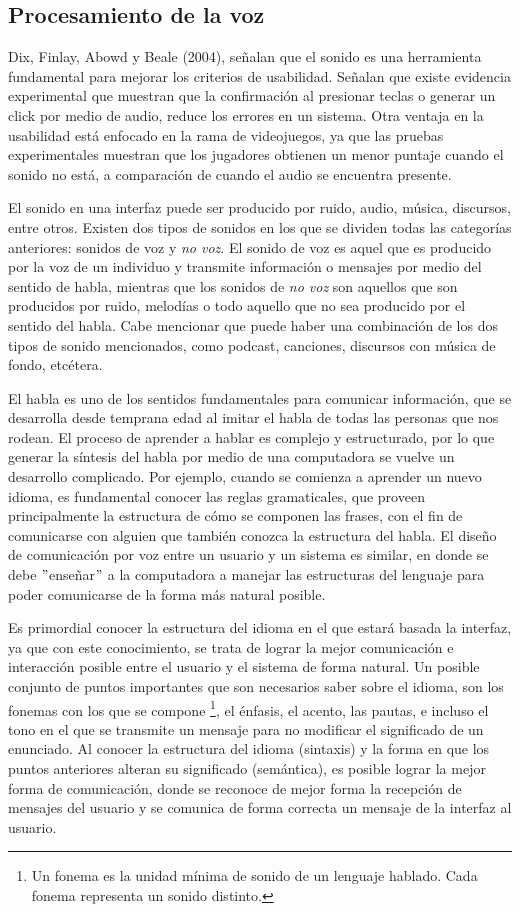 \subsection{Procesamiento de la voz}
\label{ProcesamientoVozCap3}

Dix, Finlay, Abowd y Beale (2004), señalan que el sonido es una herramienta fundamental para mejorar los criterios de usabilidad. Señalan que existe evidencia experimental que muestran que la confirmación al presionar teclas o generar un click por medio de audio, reduce los errores en un sistema. Otra ventaja en la usabilidad está enfocado en la rama de videojuegos, ya que las pruebas experimentales muestran que los jugadores obtienen un menor puntaje cuando el sonido no está, a comparación de cuando el audio se encuentra presente. 

El sonido en una interfaz puede ser producido por ruido, audio, música, discursos, entre otros. Existen dos tipos de sonidos en los que se dividen todas las categorías anteriores: sonidos de voz y \textit{no voz}. El sonido de voz es aquel que es producido por la voz de un individuo y transmite información o mensajes por medio del sentido de habla, mientras que los sonidos de \textit{no voz} son aquellos que son producidos por ruido, melodías o todo aquello que no sea producido por el sentido del habla. Cabe mencionar que puede haber una combinación de los dos tipos de sonido mencionados, como podcast, canciones, discursos con música de fondo, etcétera.

El habla es uno de los sentidos fundamentales para comunicar información, que se desarrolla desde temprana edad al imitar el habla de todas las personas que nos rodean. El proceso de aprender a hablar es complejo y estructurado, por lo que generar la síntesis del habla por medio de una computadora se vuelve un desarrollo complicado. Por ejemplo, cuando se comienza a aprender un nuevo idioma, es fundamental conocer las reglas gramaticales, que proveen principalmente la estructura de cómo se componen las frases, con el fin de comunicarse con alguien que también conozca la estructura del habla. El diseño de comunicación por voz entre un usuario y un sistema es similar, en donde se debe $"$enseñar$"$ a la computadora a manejar las estructuras del lenguaje para poder comunicarse de la forma más natural posible.

Es primordial conocer la estructura del idioma en el que estará basada la interfaz, ya que con este conocimiento, se trata de lograr la mejor comunicación e interacción posible entre el usuario y el sistema de forma natural. Un posible conjunto de puntos importantes que son necesarios saber sobre el idioma, son los fonemas con los que se compone \footnote{Un fonema es la unidad mínima de sonido de un lenguaje hablado. Cada fonema representa un sonido distinto.}, el énfasis, el acento, las pautas, e incluso el tono en el que se transmite un mensaje para no modificar el significado de un enunciado. Al conocer la estructura del idioma (sintaxis) y la forma en que los puntos anteriores alteran su significado (semántica), es posible lograr la mejor forma de comunicación, donde se reconoce de mejor forma la recepción de mensajes del usuario y se comunica de forma correcta un mensaje de la interfaz al usuario.

